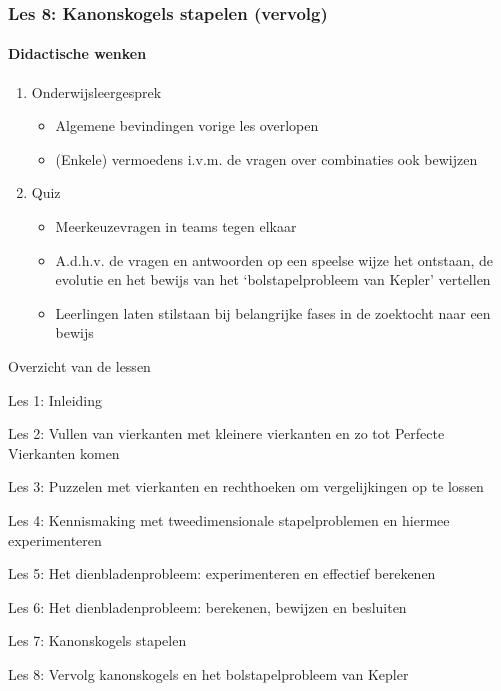 \documentclass[dutch]{beamer}
\begin{document}
\begin{frame}
\frametitle{Les 8: Kanonskogels stapelen {\small (vervolg)}}
\framesubtitle{Didactische wenken}

\begin{enumerate}
	\item Onderwijsleergesprek
	\begin{itemize}
	\item Algemene bevindingen vorige les overlopen
	\item (Enkele) vermoedens i.v.m. de vragen over combinaties ook bewijzen
\end{itemize}
	\item{Quiz}
	\begin{itemize}
	\item Meerkeuzevragen in teams tegen elkaar
	\item A.d.h.v. de vragen en antwoorden op een speelse wijze het ontstaan, de evolutie en het bewijs van het \textquoteleft bolstapelprobleem van Kepler' vertellen
	\item Leerlingen laten stilstaan bij belangrijke fases in de zoektocht naar een bewijs
\end{itemize}
\end{enumerate}

\end{frame}






\begin{frame}
{Overzicht van de lessen}
\begin{list}{\quad}{}
\item Les 1: Inleiding
\item Les 2: Vullen van vierkanten met kleinere vierkanten en zo tot Perfecte Vierkanten komen
\item Les 3: Puzzelen met vierkanten en rechthoeken om vergelijkingen op te lossen
\item Les 4: Kennismaking met tweedimensionale stapelproblemen en hiermee experimenteren
\item Les 5: Het dienbladenprobleem: experimenteren en effectief berekenen
\item Les 6: Het dienbladenprobleem: berekenen, bewijzen en besluiten
\item Les 7: Kanonskogels stapelen
\item Les 8: Vervolg kanonskogels en het bolstapelprobleem van Kepler
\end{list}
\end{frame}
\end{document}
